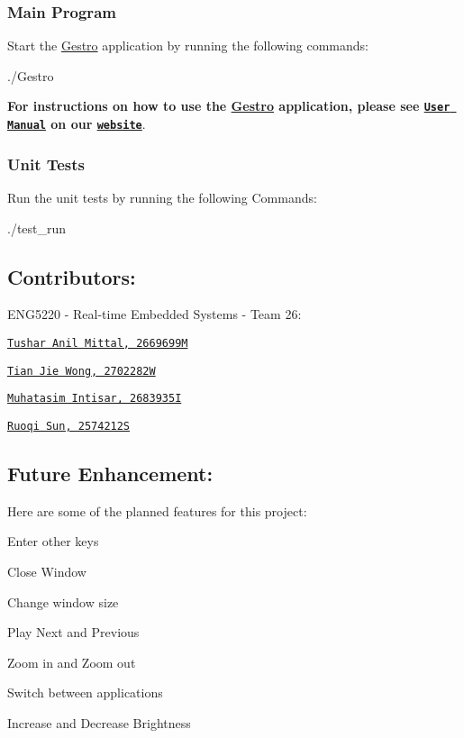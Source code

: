 \subsubsection*{Main Program}

Start the \hyperlink{namespaceGestro}{Gestro} application by running the following commands\+:


\begin{DoxyCode}
./Gestro
\end{DoxyCode}
 {\bfseries For instructions on how to use the \hyperlink{namespaceGestro}{Gestro} application, please see \href{https://randomguy-coder.github.io/Gestro/user_manual.html}{\tt User Manual} on our \href{https://randomguy-coder.github.io/Gestro/}{\tt website}}.

\subsubsection*{Unit Tests}

Run the unit tests by running the following Commands\+: 
\begin{DoxyCode}
./test\_run
\end{DoxyCode}


\subsection*{Contributors\+:}

E\+N\+G5220 -\/ Real-\/time Embedded Systems -\/ Team 26\+:
\begin{DoxyItemize}
\item \href{https://github.com/RandomGuy-coder}{\tt Tushar Anil Mittal, 2669699M}
\item \href{https://github.com/terrsoshi}{\tt Tian Jie Wong, 2702282W}
\item \href{https://github.com/MuhatasimIntisar}{\tt Muhatasim Intisar, 2683935I}
\item \href{https://github.com/David2574}{\tt Ruoqi Sun, 2574212S}
\end{DoxyItemize}

\subsection*{Future Enhancement\+:}

Here are some of the planned features for this project\+:
\begin{DoxyItemize}
\item Enter other keys
\item Close Window
\item Change window size
\item Play Next and Previous
\item Zoom in and Zoom out
\item Switch between applications
\item Increase and Decrease Brightness
\end{DoxyItemize}


